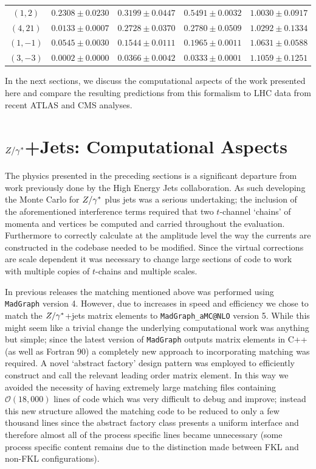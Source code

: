 \begin{table}[hbt]
\begin{tabular}{c|c|c|c|c}
	$(1, 2)$   &    $0.2308 \pm 0.0230$ &   $0.3199 \pm 0.0447$ &   $0.5491 \pm 0.0032$  & $1.0030 \pm 0.0917$ \\
	$(4, 21)$  &    $0.0133 \pm 0.0007$ &   $0.2728 \pm 0.0370$ &   $0.2780 \pm 0.0509$  & $1.0292 \pm 0.1334$ \\
	$(1,-1)$   &    $0.0545 \pm 0.0030$ &   $0.1544 \pm 0.0111$ &   $0.1965 \pm 0.0011$  & $1.0631 \pm 0.0588$ \\
	$(3,-3)$   &    $0.0002 \pm 0.0000$ &   $0.0366 \pm 0.0042$ &   $0.0333 \pm 0.0001$  & $1.1059 \pm 0.1251$ \\ \hline
	\end{tabular}
	\end{table}

	In the next sections, we discuss the computational aspects of the work presented
	here and compare the resulting predictions from this formalism to LHC data from
	recent ATLAS and CMS analyses.

\section{$Z/\gamma^*$+Jets: Computational Aspects}
	\label{sec:comp}

	The physics presented in the preceding sections is a significant departure from
	work previously done by the High Energy Jets collaboration.  As such developing
	the Monte Carlo for $Z/\gamma^*$ plus jets was a serious undertaking; the inclusion of
	the aforementioned interference terms required that two $t$-channel `chains' of
	momenta and vertices be computed and carried throughout the evaluation.
	Furthermore to correctly calculate at the amplitude level the way the \hej currents
	are constructed in the codebase needed to be modified.  Since the virtual corrections
	are scale dependent it was necessary to change large sections of code to work with
	multiple copies of $t$-chains and multiple scales.

	In previous \HEJ releases the matching mentioned above was performed using
	\texttt{MadGraph} version 4.  However, due to increases in speed and efficiency
	we chose to match the $Z/\gamma^*$+jets \HEJ matrix elements to \texttt{MadGraph\_aMC@NLO} version 5.
	While this might seem like a trivial change the underlying computational work
	was anything but simple; since the latest version of \texttt{MadGraph} outputs
	matrix elements in C++ (as well as Fortran 90) a completely new approach
	to incorporating matching was required.  A novel `abstract factory' design pattern
	was employed to efficiently construct and call the relevant leading order
	matrix element.  In this way we avoided the necessity of having extremely large
	matching files containing $\mathcal{O}(18,000)$ lines of code which was very difficult to
	debug and improve; instead this new structure allowed the matching code to
	be reduced to only a few thousand lines since the abstract factory class
	presents a uniform interface and therefore almost all of the process specific
	lines became unnecessary (some process specific content remains due to the
	distinction made between FKL and non-FKL configurations).

